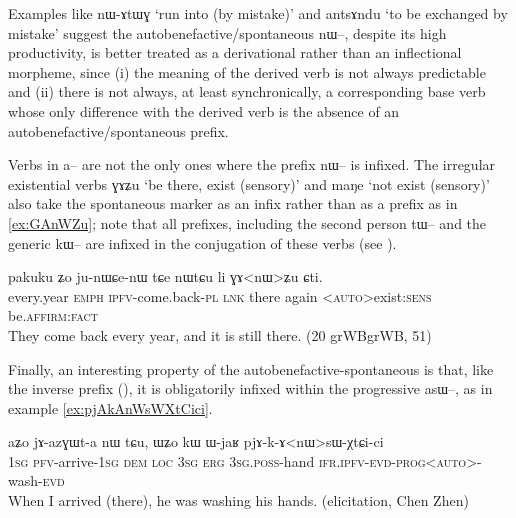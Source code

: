 \documentclass[oldfontcommands,oneside,a4paper,11pt]{article}
\newcommand{\ipa}[1]{{\phon \mbox{#1}}} %
\begin{document}
Examples like \ipa{nɯ-ɤtɯɣ}  `run into (by mistake)' and \ipa{antsɤndu} `to be exchanged by mistake'   suggest the autobenefactive/spontaneous \ipa{nɯ--}, despite its high productivity, is better treated as a derivational rather than an inflectional morpheme, since (i) the meaning of the derived verb is not always predictable and (ii) there is not always, at least synchronically, a corresponding base verb whose only difference with the derived verb is the absence of an autobenefactive/spontaneous prefix.
 
Verbs in \ipa{a--} are not the only ones where the prefix \ipa{nɯ--} is infixed. The irregular existential verbs \ipa{ɣɤʑu} `be there, exist (sensory)'  and \ipa{maŋe} `not exist (sensory)' also take  the spontaneous marker as an infix rather than as a prefix as in \ref{ex:GAnWZu}; note that all prefixes, including the second person \ipa{tɯ--} and the generic \ipa{kɯ--} are infixed in the conjugation of these verbs (see \citealt{jacques12agreement, jacques15generic}).
\begin{exe}
\ex \label{ex:GAnWZu}
\gll 
 \ipa{pakuku}  	\ipa{ʑo}  	\ipa{ju-nɯɕe-nɯ}  	\ipa{tɕe}  	\ipa{nɯtɕu}  	\ipa{li}  	\ipa{ɣɤ<nɯ>ʑu}  	\ipa{ɕti.}  	\\
 every.year \textsc{emph} \textsc{ipfv}-come.back-\textsc{pl} \textsc{lnk} there again <\textsc{auto}>exist:\textsc{sens} be.\textsc{affirm:fact} \\
 \glt They come back every year, and it is still there. (20 grWBgrWB, 51)
\end{exe}

Finally, an interesting property of the autobenefactive-spontaneous is that, like the inverse prefix (\citealt[199]{jacques13harmonization}), it is obligatorily infixed within the progressive \ipa{asɯ--}, as in example \ref{ex:pjAkAnWsWXtCici}. 

\begin{exe}
\ex  \label{ex:pjAkAnWsWXtCici}
\gll
\ipa{aʑo}  	\ipa{jɤ-azɣɯt-a}  	\ipa{nɯ} \ipa{tɕu,}  	\ipa{ɯʑo}  	\ipa{kɯ}  	\ipa{ɯ-jaʁ}  	\ipa{pjɤ-k-ɤ<nɯ>sɯ-χtɕi-ci}  \\
 \textsc{1sg} \textsc{pfv}-arrive-\textsc{1sg} \textsc{dem} \textsc{loc} \textsc{3sg} \textsc{erg} \textsc{3sg.poss}-hand \textsc{ifr.ipfv-evd-prog<auto>}-wash-\textsc{evd} \\
\glt When I arrived (there), he was washing his hands. (elicitation, Chen Zhen)
\end{exe}
\end{document}
